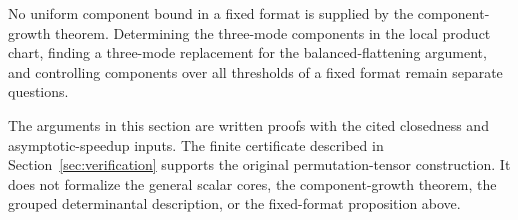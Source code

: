 No uniform component bound in a fixed format is supplied by the
component-growth theorem. Determining the three-mode components in
the local product chart, finding a three-mode replacement for the
balanced-flattening argument, and controlling components over all
thresholds of a fixed format remain separate questions.

The arguments in this section are written proofs with the cited
closedness and asymptotic-speedup inputs. The finite certificate
described in Section~\ref{sec:verification} supports the original
permutation-tensor construction. It does not formalize the general
scalar cores, the component-growth theorem, the grouped
determinantal description, or the fixed-format proposition above.
